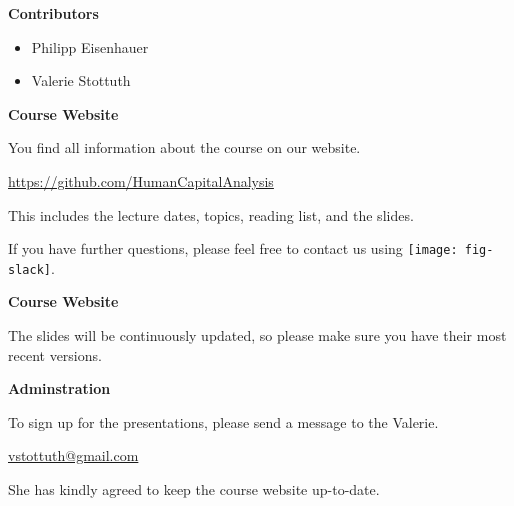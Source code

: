 \begin{frame}\textbf{Contributors}\vspace{0.3cm}

\begin{itemize}\setlength\itemsep{1em}
\item Philipp Eisenhauer
\item Valerie Stottuth
\end{itemize}

\end{frame}
\begin{frame}
	\textbf{Course Website}\vspace{0.3cm}

You find all information about the course on our website.

\begin{center}
\url{https://github.com/HumanCapitalAnalysis}
\end{center}

This includes the lecture dates, topics, reading list, and the slides.\vspace{0.3cm}

If you have further questions, please feel free to contact us using
\texttt{[image: fig-slack]}.

\end{frame}
\begin{frame}
	\textbf{Course Website}\vspace{0.3cm}

The slides will be continuously updated, so please make sure you have their most recent versions.

\end{frame}
\begin{frame}
	\textbf{Adminstration}\vspace{0.3cm}

To sign up for the presentations, please send a message to the Valerie.

\begin{center}
\href{mailto:vstottuth@gmail.com}{vstottuth@gmail.com}
\end{center}

She has kindly agreed to keep the course website up-to-date.

\end{frame}
